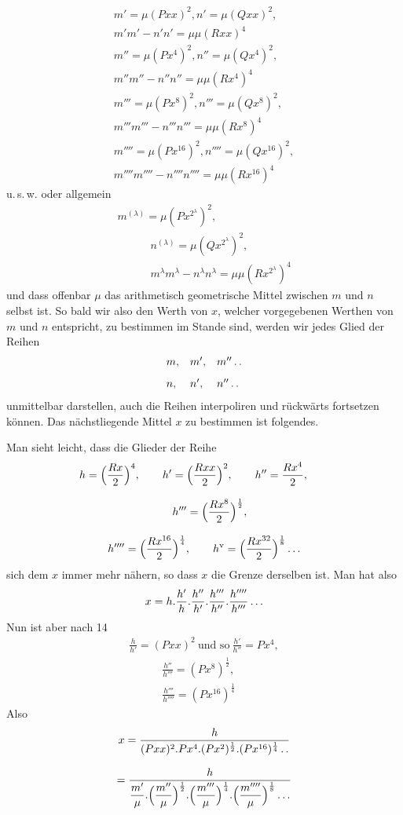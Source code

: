 \[
\begin{gathered}
m'=\mu(Pxx)^2, n'=\mu(Qxx)^2,\\[6pt]m'm'-n'n'=\mu\mu(Rxx)^4\\[8pt]
m''=\mu(Px^4)^2,n''=\mu(Qx^4)^2,\\[6pt]m''m''-n''n''=\mu\mu(Rx^4)^4\\[8pt]
m'''=\mu(Px^8)^2,n'''=\mu(Qx^8)^2,\\[6pt]m'''m'''-n'''n'''=\mu\mu(Rx^8)^4\\[8pt]
m''''=\mu(Px^{16})^2,n''''=\mu(Qx^{16})^2,\\[6pt]m''''m''''-n''''n''''=\mu\mu(Rx^{16})^4
\end{gathered}
\]
u.\,s.\,w. oder allgemein
\[
\begin{gathered}m^{(\lambda)}=\mu(Px^{2^\lambda})^2,\\[8pt]\quad{}\qquad
n^{(\lambda)}=\mu(Qx^{2^\lambda})^2,\\[8pt]\quad{}\qquad
m^\lambda m^\lambda-n^\lambda n^\lambda=\mu\mu(Rx^{2^\lambda})^4\end{gathered}
\]
und dass offenbar $\mu$ das arithmetisch geometrische Mittel zwischen $m$ und $n$ selbst ist. So bald wir also den Werth von $x$, welcher vorgegebenen Werthen von $m$ und $n$ entspricht, zu bestimmen im Stande sind, werden wir jedes Glied der Reihen
\[
\begin{array}{lll}
m,&m',&m''\mathinner{.\,.}\\[8pt]
n,&n',&n''\mathinner{.\,.}
\end{array}
\]
unmittelbar darstellen, auch die Reihen interpoliren und rückwärts fortsetzen können. Das nächstliegende Mittel $x$ zu bestimmen ist folgendes.

Man sieht leicht, dass die Glieder der Reihe
\[
\begin{gathered}
h=\Bigl(\frac{Rx}{2}\Bigr)^4,\qquad
h'=\Bigl(\frac{Rxx}{2}\Bigr)^2,\qquad
h''=\frac{Rx^4}{2},\qquad
\\[8pt]\quad{}h'''=\Bigl(\frac{Rx^8}{2}\Bigr)^{\frac12},\\[8pt]
h''''=\Bigl(\frac{Rx^{16}}{2}\Bigr)^{\frac14},\qquad
h^{\mathrm{v}}=\Bigl(\frac{Rx^{32}}{2}\Bigr)^{\frac18}\mathinner{.\,.\,.}
\end{gathered}
\]
sich dem $x$ immer mehr nähern, so dass $x$ die Grenze derselben ist. Man hat also
\[
x=h.\frac{h'}{h}.\frac{h''}{h'}.\frac{h'''}{h''}.\frac{h''''}{h'''}\mathinner{.\,.\,.}
\]
Nun ist aber nach 14
\[
\begin{gathered}\frac{h}{h'}=(Pxx)^2\ \text{und so}\ \frac{h'}{h''}=Px^4,\\[8pt]\quad{}\qquad
\frac{h''}{h'''}=(Px^8)^{\frac12},\\[8pt]\quad{}\qquad
\frac{h'''}{h''''}=(Px^{16})^{\frac14}\end{gathered}
\]
Also
\[
\begin{gathered}
x=\frac{h}{(Pxx)^2.Px^4.(Px^2)^{\frac12}.(Px^{16})^{\frac14}\mathinner{.\,.}}\\[8pt]
=\frac{h}{\dfrac{m'}{\mu}.\Bigl(\dfrac{m''}{\mu}\Bigr)^{\frac12}.\Bigl(\dfrac{m'''}{\mu}\Bigr)^{\frac14}.\Bigl(\dfrac{m''''}{\mu}\Bigr)^{\frac18}\mathinner{.\,.\,.}}
\end{gathered}
\]

